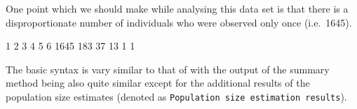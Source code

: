 \documentclass[
]{jss}
\newcommand{\1}{\mathcal{I}} \newcommand{\bZero}{\boldsymbol{0}}
\begin{document}
One point which we should make while analysing this data set is that
there is a disproportionate number of individuals who were observed only
once (i.e.~1645).

\begin{CodeChunk}
\begin{CodeOutput}

   1    2    3    4    5    6 
1645  183   37   13    1    1 
\end{CodeOutput}
\end{CodeChunk}

The basic syntax is vary similar to that of  with the output
of the summary method being also quite similar except for the additional
results of the population size estimates (denoted as
\texttt{Population size estimation results}).
\end{document}
